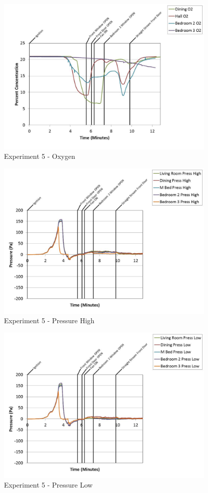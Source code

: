 \documentclass{article}
\begin{document}
\begin{appendices}
	\begin{figure}[h!]
		\centering
		\includegraphics[height=3.05in]{0_Images/Results_Charts/Exp_5_Charts/Oxygen.pdf}
		\caption{Experiment 5 - Oxygen}
	\end{figure}
 
	\clearpage

	\begin{figure}[h!]
		\centering
		\includegraphics[height=3.05in]{0_Images/Results_Charts/Exp_5_Charts/PressureHigh.pdf}
		\caption{Experiment 5 - Pressure High}
	\end{figure}
 

	\begin{figure}[h!]
		\centering
		\includegraphics[height=3.05in]{0_Images/Results_Charts/Exp_5_Charts/PressureLow.pdf}
		\caption{Experiment 5 - Pressure Low}
	\end{figure}
 

\end{appendices}
\end{document}
